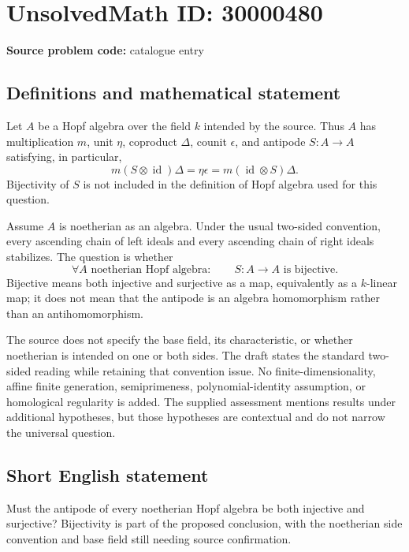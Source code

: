 \documentclass[11pt]{article}
\begin{document}
\section*{UnsolvedMath ID: 30000480}
\textbf{Source problem code:} catalogue entry
\subsection{Definitions and mathematical statement}
Let $A$ be a Hopf algebra over the field $k$ intended by the source. Thus $A$ has multiplication $m$, unit $\eta$, coproduct $\Delta$, counit $\epsilon$, and antipode $S:A\to A$ satisfying, in particular,
\[
 m(S\otimes\operatorname{id})\Delta
   =\eta\epsilon
   =m(\operatorname{id}\otimes S)\Delta.
\]
Bijectivity of $S$ is not included in the definition of Hopf algebra used for this question.

Assume $A$ is noetherian as an algebra. Under the usual two-sided convention, every ascending chain of left ideals and every ascending chain of right ideals stabilizes. The question is whether
\[
 \forall A\text{ noetherian Hopf algebra}:\qquad
 S:A\longrightarrow A\text{ is bijective}.
\]
Bijective means both injective and surjective as a map, equivalently as a $k$-linear map; it does not mean that the antipode is an algebra homomorphism rather than an antihomomorphism.

The source does not specify the base field, its characteristic, or whether noetherian is intended on one or both sides. The draft states the standard two-sided reading while retaining that convention issue. No finite-dimensionality, affine finite generation, semiprimeness, polynomial-identity assumption, or homological regularity is added. The supplied assessment mentions results under additional hypotheses, but those hypotheses are contextual and do not narrow the universal question.
\subsection{Short English statement}
Must the antipode of every noetherian Hopf algebra be both injective and surjective? Bijectivity is part of the proposed conclusion, with the noetherian side convention and base field still needing source confirmation.
\end{document}
